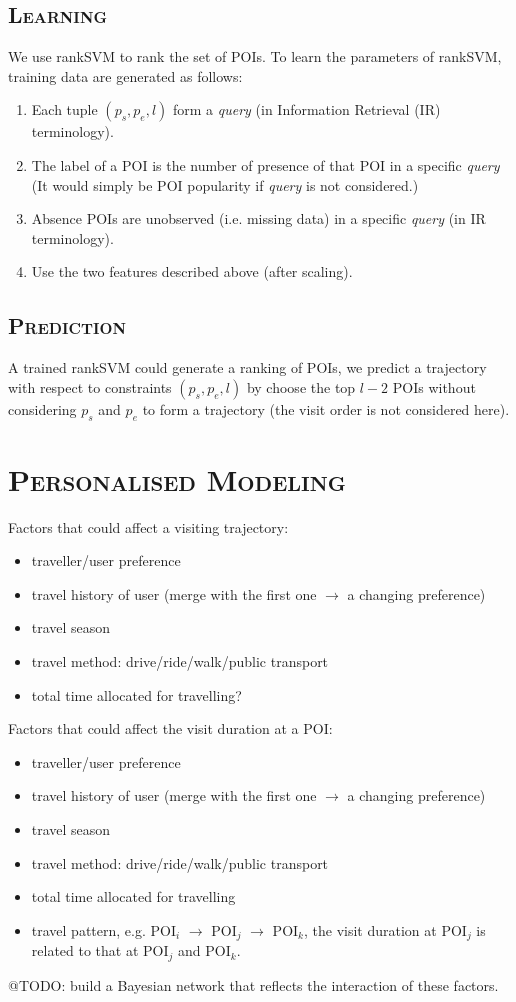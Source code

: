 \documentclass[11pt, a4paper]{article}
\begin{document}
\subsection{\textsc{Learning}}
We use rankSVM\cite{herbrich99} to rank the set of POIs.
To learn the parameters of rankSVM,
training data are generated as follows:
\begin{enumerate}
\item Each tuple $(p_s, p_e, l)$ form a \textit{query} (in Information Retrieval (IR) terminology). 
\item The label of a POI is the number of presence of that POI in a specific \textit{query} 
      (It would simply be POI popularity if \textit{query} is not considered.)
\item Absence POIs are unobserved (i.e. missing data) in a specific \textit{query} (in IR terminology).
\item Use the two features described above (after scaling).
\end{enumerate}

\subsection{\textsc{Prediction}}
A trained rankSVM could generate a ranking of POIs, we predict a trajectory with respect to constraints
$(p_s, p_e, l)$ by choose the top $l-2$ POIs without considering 
$p_s$ and $p_e$ to form a trajectory (the visit order is not considered here).


\section{\textsc{Personalised Modeling}}
Factors that could affect a visiting trajectory:
\begin{itemize}
\item traveller/user preference
\item travel history of user (merge with the first one $\to$ a changing preference)
\item travel season
\item travel method: drive/ride/walk/public transport
\item total time allocated for travelling?
\end{itemize}
Factors that could affect the visit duration at a POI:
\begin{itemize}
\item traveller/user preference
\item travel history of user (merge with the first one $\to$ a changing preference)
\item travel season
\item travel method: drive/ride/walk/public transport
\item total time allocated for travelling
\item travel pattern, e.g. POI$_i$ $\to$ POI$_j$ $\to$ POI$_k$, 
      the visit duration at POI$_j$ is related to that at POI$_j$ and POI$_k$.
\end{itemize}
@TODO: build a Bayesian network that reflects the interaction of these factors.
\end{document}
